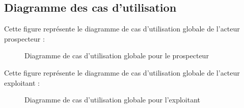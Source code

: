 \subsection{Diagramme des cas d'utilisation}
Cette figure repr\'esente le diagramme de cas d'utilisation globale de l'acteur prospecteur :
\begin{figure}[H]
	\caption{\label{fig:my-label} Diagramme de cas d'utilisation globale pour le prospecteur}
\end{figure}

Cette figure repr\'esente le diagramme de cas d'utilisation globale de l'acteur exploitant :
\begin{figure}[H]
	\caption{\label{fig:my-label} Diagramme de cas d'utilisation globale pour l'exploitant}
\end{figure}

